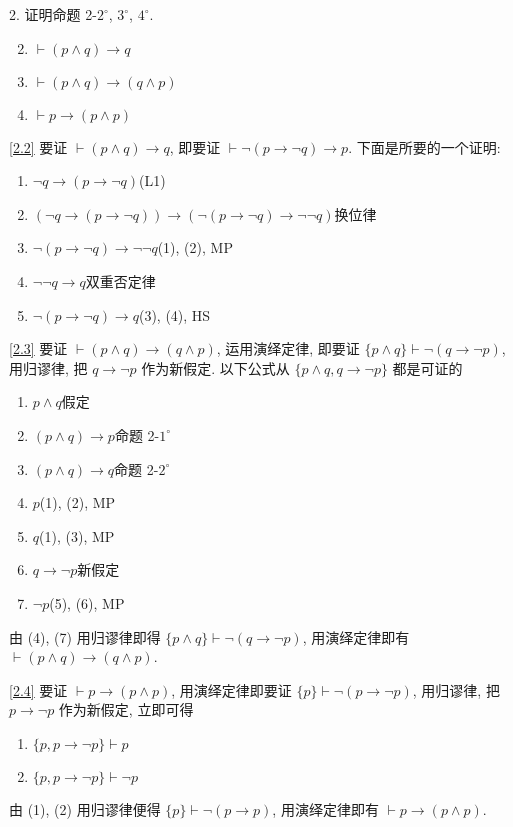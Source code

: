 \documentclass[boxes]{homework}
\begin{document}
\begin{problem}
2. 证明命题 2-$2^\circ$, $3^\circ$, $4^\circ$.
\begin{enumerate}[label = 2-$\arabic*^\circ$]
    \setcounter{enumi}{1}
    \item \label{2.2}$\vdash (p\land q)\to q$
    \item \label{2.3}$\vdash (p\land q)\to (q\land p)$
    \item \label{2.4}$\vdash p\to(p\land p)$
\end{enumerate}
\end{problem}

\begin{solution}
    \ref{2.2} 要证 $\vdash (p\land q)\to q$, 即要证 $\vdash \lnot (p\to \lnot q)\to p$. 下面是所要的一个证明:
    \begin{enumerate}[label = (\arabic*), itemsep = 0em, topsep = .5em, partopsep = .5em]
        \item $\lnot q\to (p\to \lnot q)$\hfill (L1)
        \item $(\lnot q\to (p\to \lnot q))\to (\lnot (p\to \lnot q)\to \lnot \lnot q)$\hfill 换位律
        \item $\lnot (p\to \lnot q)\to \lnot \lnot q$\hfill (1), (2), MP
        \item $\lnot\lnot q\to q$\hfill 双重否定律
        \item $\lnot (p\to \lnot q)\to q$\hfill (3), (4), HS
    \end{enumerate}

    \ref{2.3} 要证 $\vdash (p\land q)\to (q\land p)$, 运用演绎定律, 即要证 $\{p\land q\}\vdash \lnot(q\to\lnot p)$, 用归谬律, 把 $q\to\lnot p$ 作为新假定. 
    以下公式从 $\{p\land q, q\to \lnot p\}$ 都是可证的
    \begin{enumerate}[label = (\arabic*), itemsep = 0em, topsep = .5em, partopsep = .5em]
        \item $p\land q$\hfill 假定
        \item $(p\land q)\to p$\hfill 命题 2-$1^\circ$
        \item $(p\land q)\to q$\hfill 命题 2-$2^\circ$
        \item $p$\hfill (1), (2), MP
        \item $q$\hfill (1), (3), MP
        \item $q\to\lnot p$\hfill 新假定
        \item $\lnot p$\hfill (5), (6), MP
    \end{enumerate}
    由 (4), (7) 用归谬律即得 $\{p\land q\}\vdash \lnot(q\to\lnot p)$, 用演绎定律即有 $\vdash (p\land q)\to (q\land p)$.

    \ref{2.4} 要证 $\vdash p\to(p\land p)$, 用演绎定律即要证 $\{p\}\vdash \lnot (p\to \lnot p)$, 用归谬律, 把 $p\to\lnot p$ 作为新假定, 立即可得
    \begin{enumerate}[label = (\arabic*), itemsep = 0em, topsep = .5em, partopsep = .5em]
        \item $\{p, p\to \lnot p\}\vdash p$
        \item $\{p, p\to \lnot p\}\vdash \lnot p$
    \end{enumerate}
    由 (1), (2) 用归谬律便得 $\{p\}\vdash\lnot (p\to p)$, 用演绎定律即有 $\vdash p\to (p\land p)$.
\end{solution}
\end{document}
